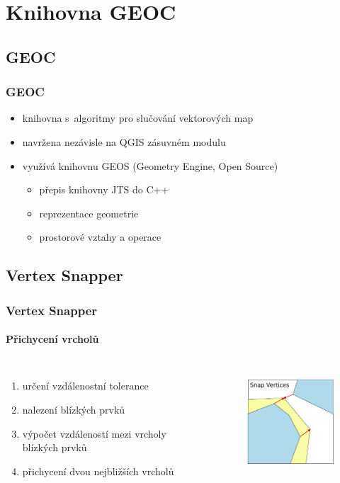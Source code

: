 \documentclass[unicode,bookmarksnumbered]{beamer}
\begin{document}
\section{Knihovna GEOC}   %

  \subsection{GEOC}
  \begin{frame}
  \frametitle{GEOC}
     \begin{itemize}
      \item knihovna s~algoritmy pro slučování vektorových map
      \item navržena nezávisle na QGIS zásuvném modulu 
      \item využívá knihovnu GEOS (Geometry Engine, Open Source)
      \begin{itemize}
       \item přepis knihovny JTS do C++
       \item reprezentace geometrie
       \item prostorové vztahy a operace
      \end{itemize}

     \end{itemize}
  \end{frame}

  \subsection{Vertex Snapper}  %
  \begin{frame}
  \frametitle{Vertex Snapper}
    \framesubtitle{Přichycení vrcholů}
    \begin{columns}[c]
	\column{2in}
	\begin{enumerate}
	   \item určení vzdálenostní tolerance
	   \item nalezení blízkých prvků
	   \item výpočet vzdáleností mezi vrcholy blízkých prvků
	   \item přichycení dvou nejbližších vrcholů
	\end{enumerate}
	\column{2in}
	  \begin{figure}
	  \centering
             \includegraphics[width=1.5in]{./pictures/snap.pdf}
	  \label{fig:vs-princip}
	  \end{figure}
      \end{columns}
  \end{frame}
\end{document}
